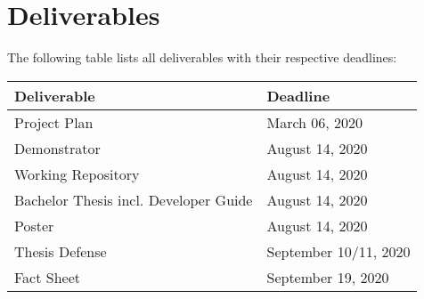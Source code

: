 \chapter{Deliverables}
\label{ch:deliverables}

The following table lists all deliverables with their respective deadlines:

\begin{tabularx}{\textwidth}{Xl}
  \toprule
  \textbf{Deliverable} & \textbf{Deadline} \\
  \midrule
  Project Plan & March 06, 2020 \\
  Demonstrator & August 14, 2020 \\
  Working Repository & August 14, 2020 \\
  Bachelor Thesis incl. Developer Guide & August 14, 2020 \\
  Poster & August 14, 2020 \\
  Thesis Defense & September 10/11, 2020 \\
  Fact Sheet & September 19, 2020 \\
  \bottomrule
\end{tabularx}
